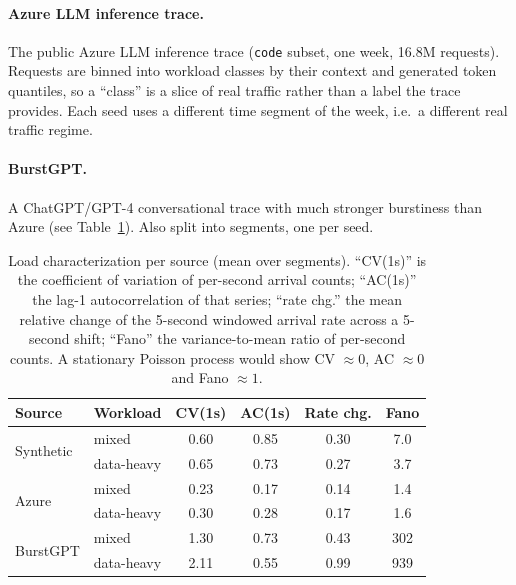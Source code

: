 \paragraph{Azure LLM inference trace.} The public Azure LLM inference trace \cite{azuretrace} (\texttt{code}
subset, one week, 16.8M requests). Requests are binned into workload classes by their context and
generated token quantiles, so a ``class'' is a slice of real traffic rather than a label the trace
provides. Each seed uses a different time segment of the week, i.e.\ a different real traffic
regime.

\paragraph{BurstGPT.} A ChatGPT/GPT-4 conversational trace \cite{burstgpt} with much stronger burstiness than
Azure (see Table~\ref{tab:loads}). Also split into segments, one per seed.

\begin{table}[t]
\centering
\caption{Load characterization per source (mean over segments). ``CV(1s)'' is the coefficient of
variation of per-second arrival counts; ``AC(1s)'' the lag-1 autocorrelation of that series;
``rate chg.'' the mean relative change of the 5-second windowed arrival rate across a 5-second
shift; ``Fano'' the variance-to-mean ratio of per-second counts. A stationary Poisson process
would show CV $\approx 0$, AC $\approx 0$ and Fano $\approx 1$.}
\label{tab:loads}
\small
\begin{tabular}{@{}llcccc@{}}
\toprule
Source & Workload & CV(1s) & AC(1s) & Rate chg. & Fano \\
\midrule
\multirow{2}{*}{Synthetic} & mixed      & 0.60 & 0.85 & 0.30 & 7.0 \\
                           & data-heavy & 0.65 & 0.73 & 0.27 & 3.7 \\
\multirow{2}{*}{Azure}     & mixed      & 0.23 & 0.17 & 0.14 & 1.4 \\
                           & data-heavy & 0.30 & 0.28 & 0.17 & 1.6 \\
\multirow{2}{*}{BurstGPT}  & mixed      & 1.30 & 0.73 & 0.43 & 302 \\
                           & data-heavy & 2.11 & 0.55 & 0.99 & 939 \\
\bottomrule
\end{tabular}
\end{table}

